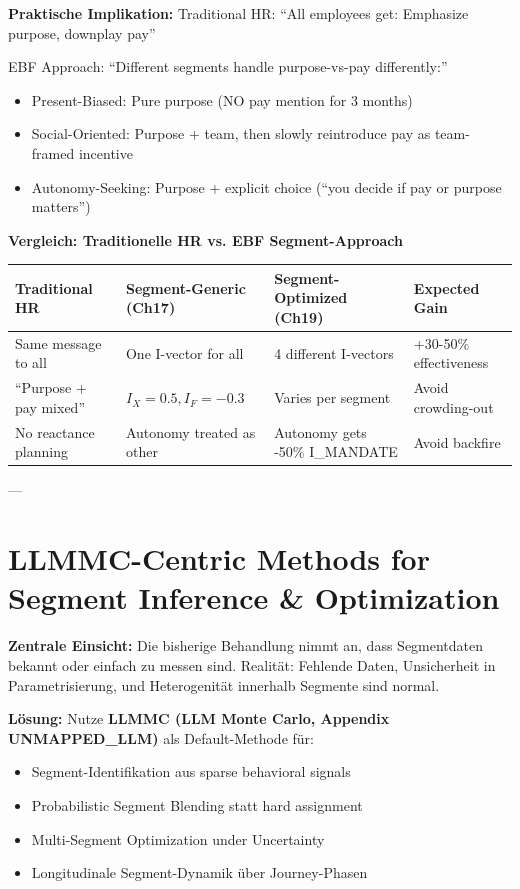 \textbf{Praktische Implikation:}
Traditional HR: ``All employees get: Emphasize purpose, downplay pay''

EBF Approach: ``Different segments handle purpose-vs-pay differently:''
\begin{itemize}[nosep]
\item Present-Biased: Pure purpose (NO pay mention for 3 months)
\item Social-Oriented: Purpose + team, then slowly reintroduce pay as team-framed incentive
\item Autonomy-Seeking: Purpose + explicit choice (``you decide if pay or purpose matters'')
\end{itemize}

\textbf{Vergleich: Traditionelle HR vs. EBF Segment-Approach}

\begin{center}
\small
\renewcommand{\arraystretch}{1.3}
\begin{tabular}{@{}llll@{}}
\toprule
\textbf{Traditional HR} & \textbf{Segment-Generic (Ch17)} & \textbf{Segment-Optimized (Ch19)} & \textbf{Expected Gain} \\
\midrule
Same message to all & One I-vector for all & 4 different I-vectors & +30-50\% effectiveness \\
``Purpose + pay mixed'' & $I_X=0.5, I_F=-0.3$ & Varies per segment & Avoid crowding-out \\
No reactance planning & Autonomy treated as other & Autonomy gets -50\% I_MANDATE & Avoid backfire \\
\bottomrule
\end{tabular}
\end{center}

---

\section{LLMMC-Centric Methods for Segment Inference \& Optimization}
\label{sec:19-llmmc}

\textbf{Zentrale Einsicht:} Die bisherige Behandlung nimmt an, dass Segmentdaten bekannt oder einfach zu messen sind. Realität: Fehlende Daten, Unsicherheit in Parametrisierung, und Heterogenität innerhalb Segmente sind normal.

\textbf{Lösung:} Nutze \textbf{LLMMC (LLM Monte Carlo, Appendix UNMAPPED_LLM)} als Default-Methode für:
\begin{itemize}[nosep]
\item Segment-Identifikation aus sparse behavioral signals
\item Probabilistic Segment Blending statt hard assignment
\item Multi-Segment Optimization under Uncertainty
\item Longitudinale Segment-Dynamik über Journey-Phasen
\end{itemize}

